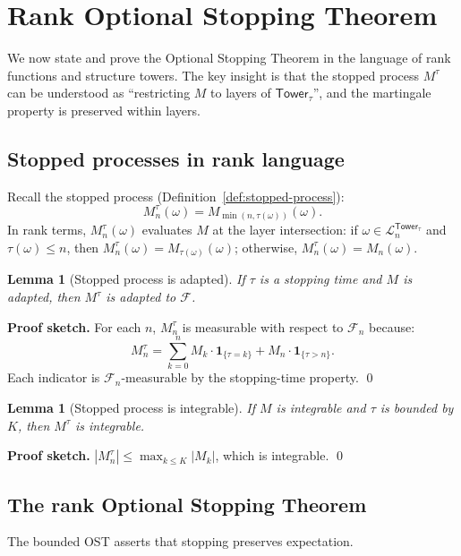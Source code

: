 \documentclass[11pt]{article}
\newtheorem{lemma}[theorem]{Lemma}
\theoremstyle{definition}
\theoremstyle{remark}
\newcommand{\layer}{\mathcal{L}}
\newcommand{\Tower}{\mathsf{Tower}}
\newcommand{\Filtration}{\mathcal{F}}
\begin{document}
\section{Rank Optional Stopping Theorem}
\label{sec:rank-ost}

We now state and prove the Optional Stopping Theorem in the language of rank functions and structure towers.
The key insight is that the stopped process $M^\tau$ can be understood as ``restricting $M$ to layers of $\Tower_\tau$'', and the martingale property is preserved within layers.

\subsection{Stopped processes in rank language}

Recall the stopped process (Definition~\ref{def:stopped-process}):
\[
M^\tau_n(\omega) = M_{\min(n, \tau(\omega))}(\omega).
\]
In rank terms, $M^\tau_n(\omega)$ evaluates $M$ at the layer intersection: if $\omega \in \layer_n^{\Tower_\tau}$ and $\tau(\omega) \leq n$, then $M^\tau_n(\omega) = M_{\tau(\omega)}(\omega)$; otherwise, $M^\tau_n(\omega) = M_n(\omega)$.

\begin{lemma}[Stopped process is adapted]
\label{lem:stopped-adapted}
If $\tau$ is a stopping time and $M$ is adapted, then $M^\tau$ is adapted to $\Filtration$.
\end{lemma}

\noindent\textbf{Proof sketch.}
For each $n$, $M^\tau_n$ is measurable with respect to $\Filtration_n$ because:
\[
M^\tau_n = \sum_{k=0}^n M_k \cdot \mathbf{1}_{\{\tau = k\}} + M_n \cdot \mathbf{1}_{\{\tau > n\}}.
\]
Each indicator is $\Filtration_n$-measurable by the stopping-time property.
\qed

\begin{lemma}[Stopped process is integrable]
\label{lem:stopped-integrable}
If $M$ is integrable and $\tau$ is bounded by $K$, then $M^\tau$ is integrable.
\end{lemma}

\noindent\textbf{Proof sketch.}
$|M^\tau_n| \leq \max_{k \leq K} |M_k|$, which is integrable.
\qed

\subsection{The rank Optional Stopping Theorem}

The bounded OST asserts that stopping preserves expectation.
\end{document}
